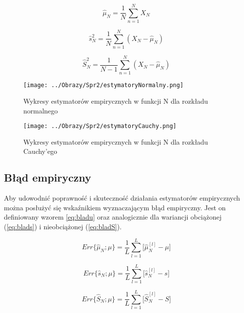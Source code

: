 \documentclass[12pt,a4paper]{article}
\begin{document}
\begin{equation}\label{eq:estymatorWartOczek}
\hat{\mu}_{N} = \frac{1}{N}\sum_{n=1}^{N}X_{N}
\end{equation}

\begin{equation}\label{eq:estymatorVarO}
\hat{s}^{2}_{N} = \frac{1}{N}\sum_{n=1}^{N}(X_{N}-\hat{\mu}_{N})
\end{equation}

\begin{equation}\label{eq:estymatorVarNO}
\hat{S}^{2}_{N} = \frac{1}{N-1}\sum_{n=1}^{N}(X_{N}-\hat{\mu}_{N})
\end{equation}

\begin{figure}[H]
\centering
\texttt{[image: ../Obrazy/Spr2/estymatoryNormalny.png]} 
\caption{Wykresy estymatorów empirycznych w funkcji N dla rozkładu normalnego}
\label{fig:estymatory}
\end{figure}

\begin{figure}[H]
\centering
\texttt{[image: ../Obrazy/Spr2/estymatoryCauchy.png]} 
\caption{Wykresy estymatorów empirycznych w funkcji N dla rozkładu Cauchy'ego}
\label{fig:estymatoryCauchy}
\end{figure}

\subsection{Błąd empiryczny}
Aby udowodnić poprawność i skuteczność działania estymatorów empirycznych można posłużyć się wskaźnikiem wyznaczającym błąd empiryczny.
Jest on definiowany wzorem \ref{eq:bladu} oraz analogicznie dla wariancji obciążonej (\ref{eq:blads}) i nieobciążonej (\ref{eq:bladS}).

\begin{equation}\label{eq:bladu}
Err\{\hat{\mu}_{N};\mu\}=\frac{1}{L}\sum\limits_{l=1}^{L}\Big[\hat{\mu}_{N}^{[l]}-\mu\Big]
\end{equation}

\begin{equation}\label{eq:blads}
Err\{\hat{s}_{N};\mu\}=\frac{1}{L}\sum\limits_{l=1}^{L}\Big[\hat{s}_{N}^{[l]}-s\Big]
\end{equation}

\begin{equation}\label{eq:bladS}
Err\{\hat{S}_{N};\mu\}=\frac{1}{L}\sum\limits_{l=1}^{L}\Big[\hat{S}_{N}^{[l]}-S\Big]
\end{equation}
\end{document}
